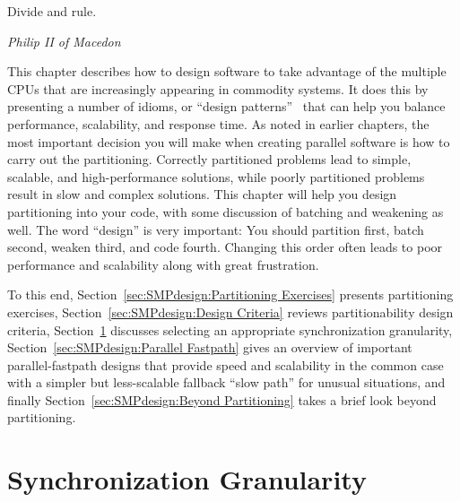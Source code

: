 

\epigraph{Divide and rule.}{\emph{Philip II of Macedon}}

This chapter describes how to design software to take advantage of
the multiple CPUs that are increasingly appearing in commodity systems.
It does this by presenting a number of idioms, or
``design patterns''~\cite{Alexander79,GOF95,SchmidtStalRohnertBuschmann2000v2Textbook}
that can help you balance performance, scalability, and response time.
As noted in earlier chapters, the most important decision you will make
when creating parallel software is how to carry out the partitioning.
Correctly partitioned problems lead to simple, scalable, and
high-performance solutions, while poorly partitioned problems result
in slow and complex solutions.
This chapter will help you design partitioning into your code, with
some discussion of batching and weakening as well.
The word ``design'' is very important: You should partition first,
batch second, weaken third, and code fourth.
Changing this order often leads to poor performance and scalability
along with great frustration.

To this end, Section~\ref{sec:SMPdesign:Partitioning Exercises}
presents partitioning exercises,
Section~\ref{sec:SMPdesign:Design Criteria} reviews partitionability
design criteria,
Section~\ref{sec:SMPdesign:Synchronization Granularity}
discusses selecting an appropriate synchronization granularity,
Section~\ref{sec:SMPdesign:Parallel Fastpath}
gives an overview of important parallel-fastpath designs
that provide speed and scalability in the common case with
a simpler but less-scalable fallback ``slow path'' for unusual
situations,
and finally
Section~\ref{sec:SMPdesign:Beyond Partitioning}
takes a brief look beyond partitioning.





\section{Synchronization Granularity}
\label{sec:SMPdesign:Synchronization Granularity}

